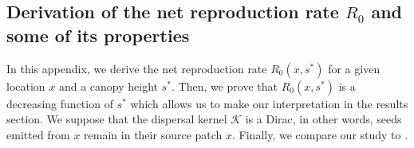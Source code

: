 \documentclass[letterpaper, 12pt]{article}
\newcommand {\s}{{s}^{*}}
\newcommand {\K}{\mathcal{K}}
\theoremstyle{theo}
\begin{document}
\tableofcontents

\begin{refsection}
\begin{onehalfspace}

\section{Derivation of the net reproduction rate $ R_0 $ and some of its properties} \label{app::calc_R0}
In this appendix, we derive the net reproduction rate $ R_0(x, \s) $ for a given location $ x $ and a canopy height $ \s $. Then, we prove that $ R_0(x, \s) $ is a decreasing function of $ \s $ which allows us to make our interpretation in the results section. We suppose that the dispersal kernel $ \K $ is a Dirac, in other words, seeds emitted from $ x $ remain in their source patch $ x $. Finally, we compare our study to \citet{Purves2009}.


\end{onehalfspace}
\end{refsection}
\end{document}
